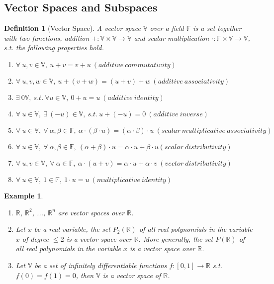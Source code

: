 \documentclass{article}
\newtheorem{definition}{Definition}[section] %
\newtheorem{example}{Example}[section]
\begin{document}
\subsection{Vector Spaces and Subspaces}
\begin{definition}[Vector Space]\label{def_vecspace}
    A vector space $\mathbb{V}$ over a field $\mathbb{F}$ is a set together with two functions, addition $+: \mathbb{V} \times \mathbb{V} \rightarrow \mathbb{V}$ and scalar multiplication $\cdot: \mathbb{F} \times \mathbb{V} \rightarrow \mathbb{V}$, s.t. the following properties hold.
    \begin{enumerate}[label=(\arabic*)]
        \item $\forall \ u,v \in \mathbb{V}, \ u+v=v+u \ (additive \ commutativity)$
        \item $\forall \ u,v,w \in \mathbb{V}, \ u+(v+w)=(u+v)+w \ (additive \ associativity)$
        \item $\exists \ 0 \mathbb{V}, \ s.t. \ \forall u \in \mathbb{V}, \ 0+u=u \ (additive \ identity)$
        \item $ \forall \ u \in \mathbb{V}, \ \exists \ (-u) \in \mathbb{V}, \ s.t. \ u+(-u)=0 \ (additive \ inverse)$
        \item $ \forall \ u \in \mathbb{V}, \ \forall \ \alpha,\beta \in \mathbb{F}, \ \alpha \cdot(\beta \cdot u)=(\alpha \cdot \beta) \cdot u \ (scalar \ multiplicative \ associativity) $
        \item $ \forall \ u \in \mathbb{V}, \ \forall \ \alpha,\beta \in \mathbb{F}, \ (\alpha+\beta) \cdot u = \alpha \cdot u + \beta \cdot u (scalar \ distributivity)$
        \item $ \forall \ u,v \in \mathbb{V}, \ \forall \ \alpha \in \mathbb{F}, \ \alpha \cdot (u+v) = \alpha \cdot u  + \alpha \cdot v \ (vector \ distributivity)$
        \item $ \forall \ u \in \mathbb{V}, \ 1 \in \mathbb{F}, \ 1 \cdot u = u \ (multiplicative \ identity)$
    \end{enumerate}
\end{definition}

\begin{example} \
    \begin{enumerate}
        \item $\mathbb{R}$, $\mathbb{R}^2$, ..., $\mathbb{R}^n$ are vector spaces over $\mathbb{R}$.
        \item Let $x$ be a real variable, the set $P_2(\mathbb{R})$ of all real polynomials in the variable $x$ of degree $\leq 2 $ is a vector space over $\mathbb{R}$. More generally, the set $P(\mathbb{R})$ of all real polynomials in the variable $x$ is a vector space over $\mathbb{R}$.
        \item Let $\mathbb{V}$ be a set of infinitely differentiable functions $f: [0,1] \rightarrow \mathbb{R}$ s.t. $f(0)=f(1)=0$, then $\mathbb{V}$ is a vector space of $\mathbb{R}$.
    \end{enumerate}
\end{example}
\end{document}
